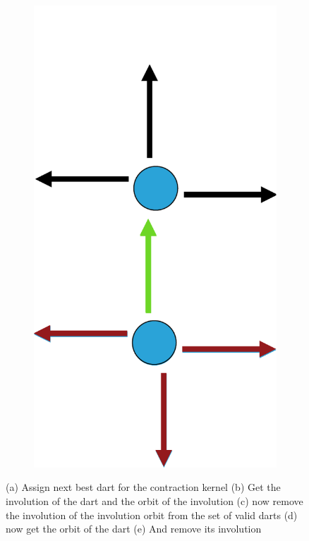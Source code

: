 \documentclass[12pt]{article}
\begin{document}
\begin{figure}[tb]
\begin{subfigure}[b]{0.15\textwidth}
      \includegraphics[width=\textwidth]{img/5}
      \caption{}\label{fig:contraction_kernel_greedy5}
  \end{subfigure}

  \caption{(a) Assign next best dart for the contraction kernel (b) Get the involution of the dart and the orbit of the involution (c) now remove the involution of the involution orbit from the set of valid darts (d) now get the orbit of the dart (e) And remove its involution}
  \label{fig:contraction_kernel_greedy}
\end{figure}
\end{document}
